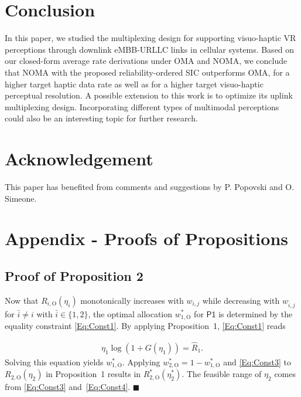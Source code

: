 \documentclass[conference]{IEEEtran}
\def\({\left(}
\def\){\right)}
\def\R{{\hat{R}_1}}
\def\OMA{\text{O}}
\begin{document}
\section{Conclusion}
In this paper, we studied the multiplexing design for supporting visuo-haptic VR perceptions through downlink eMBB-URLLC links in cellular systems. Based on our closed-form average rate derivations under OMA and NOMA, we conclude that NOMA with the proposed reliability-ordered SIC outperforms OMA, for a higher target haptic data rate as well as for a higher target visuo-haptic perceptual resolution. A possible extension to this work is to optimize its uplink multiplexing design. Incorporating different types of multimodal perceptions could also be an interesting topic for further research.

\section*{ Acknowledgement}
This paper has benefited from comments and suggestions by P. Popovski and O. Simeone.


\section*{ Appendix - Proofs of Propositions} 
\subsection{ Proof of Proposition 2}
Now that $R_{i,\OMA}(\eta_i)$ monotonically increases with $w_{i,j}$ while decreasing with $w_{\bar{i},j}$ for $\bar{i}\neq i$ with $\bar{i}\in\{1,2\}$, the optimal allocation $w_{1,\OMA}^*$ for $\textsf{P1}$ is determined by the equality constraint \eqref{Eq:Const1}. By applying Proposition~1, \eqref{Eq:Const1} reads

\vspace{-10pt}\small\begin{align}
\eta_1  \log\(1 + G(\eta_1) \) = \R. \label{Eq:Prop2_w1_Exact}
\end{align}\normalsize
Solving this equation yields $w_{1,\OMA}^*$. Applying $w_{2,\OMA}^* = 1- w_{1,\OMA}^*$ and \eqref{Eq:Const3} to $R_{2,\OMA}(\eta_2)$ in Proposition~1 results in $R_{2,\OMA}^*(\eta_2^*)$. The feasible range of $\eta_2$ comes from \eqref{Eq:Const3} and~\eqref{Eq:Const4}. \hfill$\blacksquare$
\end{document}
